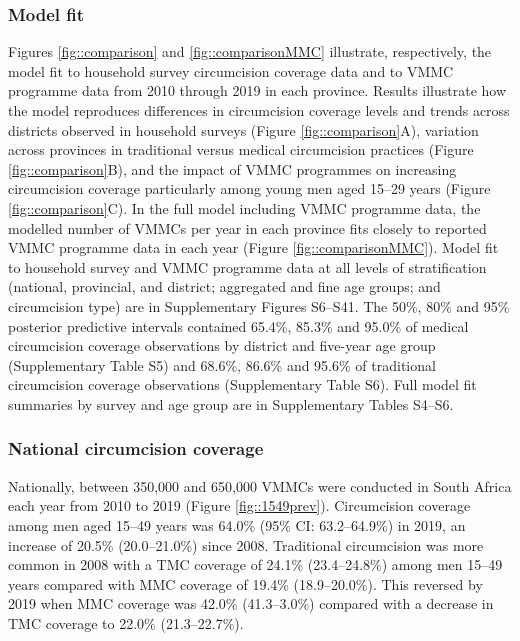 \documentclass{article}
\begin{document}
\subsubsection*{Model fit}


Figures \ref{fig::comparison} and \ref{fig::comparisonMMC} illustrate, respectively, the model fit to household survey circumcision coverage data and to VMMC programme data from 2010 through 2019 in each province. Results illustrate how the model reproduces differences in circumcision coverage levels and trends across districts observed in household surveys (Figure \ref{fig::comparison}A), variation across provinces in traditional versus medical circumcision practices (Figure \ref{fig::comparison}B), and the impact of VMMC programmes on increasing circumcision coverage particularly among young men aged 15--29 years (Figure \ref{fig::comparison}C). In the full model including VMMC programme data, the modelled number of VMMCs per year in each province fits closely to reported VMMC programme data in each year (Figure \ref{fig::comparisonMMC}). Model fit to household survey and VMMC programme data at all levels of stratification (national, provincial, and district; aggregated and fine age groups; and circumcision type) are in Supplementary Figures S6--S41. The 50\%, 80\% and 95\% posterior predictive intervals contained 65.4\%, 85.3\% and 95.0\% of medical circumcision coverage observations by district and five-year age group (Supplementary Table S5) and 68.6\%, 86.6\% and 95.6\% of traditional circumcision coverage observations (Supplementary Table S6). Full model fit summaries by survey and age group are in Supplementary Tables S4--S6.


\subsubsection*{National circumcision coverage}


Nationally, between 350,000 and 650,000 VMMCs were conducted in South Africa each year from 2010 to 2019 (Figure \ref{fig::1549prev}). Circumcision coverage among men aged 15--49 years was 64.0\% (95\% CI: 63.2--64.9\%) in 2019, an increase of 20.5\% (20.0--21.0\%) since 2008. Traditional circumcision was more common in 2008 with a TMC coverage of 24.1\% (23.4--24.8\%) among men 15--49 years compared with MMC coverage of 19.4\% (18.9--20.0\%). This reversed by 2019 when MMC coverage was  42.0\% (41.3--3.0\%) compared with a decrease in TMC coverage to 22.0\% (21.3--22.7\%).
\end{document}
